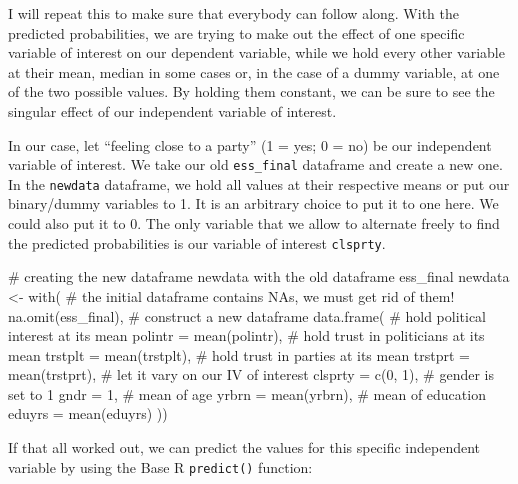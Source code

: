 \documentclass[
  letterpaper,
  DIV=11,
  numbers=noendperiod]{scrreprt}
\newenvironment{Shaded}{\begin{snugshade}}{\end{snugshade}}
\newcommand{\AttributeTok}[1]{\textcolor[rgb]{0.40,0.45,0.13}{#1}}
\newcommand{\CommentTok}[1]{\textcolor[rgb]{0.37,0.37,0.37}{#1}}
\newcommand{\DecValTok}[1]{\textcolor[rgb]{0.68,0.00,0.00}{#1}}
\newcommand{\FunctionTok}[1]{\textcolor[rgb]{0.28,0.35,0.67}{#1}}
\newcommand{\NormalTok}[1]{\textcolor[rgb]{0.00,0.23,0.31}{#1}}
\newcommand{\OtherTok}[1]{\textcolor[rgb]{0.00,0.23,0.31}{#1}}
\begin{document}
I will repeat this to make sure that everybody can follow along. With
the predicted probabilities, we are trying to make out the effect of one
specific variable of interest on our dependent variable, while we hold
every other variable at their mean, median in some cases or, in the case
of a dummy variable, at one of the two possible values. By holding them
constant, we can be sure to see the singular effect of our independent
variable of interest.

In our case, let ``feeling close to a party'' (1 = yes; 0 = no) be our
independent variable of interest. We take our old \texttt{ess\_final}
dataframe and create a new one. In the \texttt{newdata} dataframe, we
hold all values at their respective means or put our binary/dummy
variables to 1. It is an arbitrary choice to put it to one here. We
could also put it to 0. The only variable that we allow to alternate
freely to find the predicted probabilities is our variable of interest
\texttt{clsprty}.

\begin{Shaded}
\begin{Highlighting}[]
\CommentTok{\# creating the new dataframe newdata with the old dataframe ess\_final}
\NormalTok{newdata }\OtherTok{\textless{}{-}} \FunctionTok{with}\NormalTok{(}
  \CommentTok{\# the initial dataframe contains NAs, we must get rid of them!}
  \FunctionTok{na.omit}\NormalTok{(ess\_final),}
  \CommentTok{\# construct a new dataframe}
  \FunctionTok{data.frame}\NormalTok{(}
    \CommentTok{\# hold political interest at its mean}
    \AttributeTok{polintr =} \FunctionTok{mean}\NormalTok{(polintr),}
    \CommentTok{\# hold trust in politicians at its mean}
    \AttributeTok{trstplt =} \FunctionTok{mean}\NormalTok{(trstplt),}
    \CommentTok{\# hold trust in parties at its mean}
    \AttributeTok{trstprt =} \FunctionTok{mean}\NormalTok{(trstprt),}
    \CommentTok{\# let it vary on our IV of interest}
    \AttributeTok{clsprty =} \FunctionTok{c}\NormalTok{(}\DecValTok{0}\NormalTok{, }\DecValTok{1}\NormalTok{),}
    \CommentTok{\# gender is set to 1}
    \AttributeTok{gndr =} \DecValTok{1}\NormalTok{,}
    \CommentTok{\# mean of age}
    \AttributeTok{yrbrn =} \FunctionTok{mean}\NormalTok{(yrbrn),}
    \CommentTok{\# mean of education}
    \AttributeTok{eduyrs =} \FunctionTok{mean}\NormalTok{(eduyrs)}
\NormalTok{    ))}
\end{Highlighting}
\end{Shaded}

If that all worked out, we can predict the values for this specific
independent variable by using the Base R \texttt{predict()} function:
\end{document}
